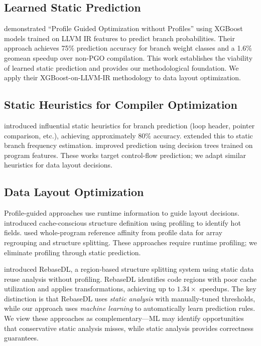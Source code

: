 \documentclass{article}
\begin{document}
\subsection{Learned Static Prediction}

\citet{rotem2021profile} demonstrated ``Profile Guided Optimization without Profiles'' using XGBoost models trained on LLVM IR features to predict branch probabilities. Their approach achieves 75\% prediction accuracy for branch weight classes and a 1.6\% geomean speedup over non-PGO compilation. This work establishes the viability of learned static prediction and provides our methodological foundation. We apply their XGBoost-on-LLVM-IR methodology to data layout optimization.

\subsection{Static Heuristics for Compiler Optimization}

\citet{ball1993branch} introduced influential static heuristics for branch prediction (loop header, pointer comparison, etc.), achieving approximately 80\% accuracy. \citet{wu1994static} extended this to static branch frequency estimation. \citet{calder1997evidence} improved prediction using decision trees trained on program features. These works target control-flow prediction; we adapt similar heuristics for data layout decisions.

\subsection{Data Layout Optimization}

Profile-guided approaches use runtime information to guide layout decisions. \citet{chilimbi1999cache} introduced cache-conscious structure definition using profiling to identify hot fields. \citet{zhong2004array} used whole-program reference affinity from profile data for array regrouping and structure splitting. These approaches require runtime profiling; we eliminate profiling through static prediction.

\citet{rohwedder2024region} introduced RebaseDL, a region-based structure splitting system using static data reuse analysis without profiling. RebaseDL identifies code regions with poor cache utilization and applies transformations, achieving up to $1.34\times$ speedups. The key distinction is that RebaseDL uses \textit{static analysis} with manually-tuned thresholds, while our approach uses \textit{machine learning} to automatically learn prediction rules. We view these approaches as complementary---ML may identify opportunities that conservative static analysis misses, while static analysis provides correctness guarantees.
\end{document}
